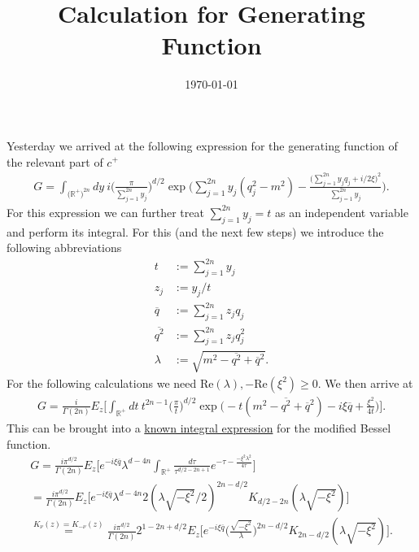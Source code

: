 \documentclass[a4paper,11pt]{article}
\begin{document}
\title{Calculation for Generating Function}
\author{ }
\date{\today}
\maketitle


Yesterday we arrived at the following expression for 
the generating function of 
the relevant part of \(c^+\)
\begin{align}
G=\int_{\big(\mathbb{R}^+\big)^{2n}}dy ~i \bigg( \frac{\pi}{\sum_{j=1}^{2n}y_j}\bigg)^{d/2}
\exp\Bigg(\sum_{j=1}^{2n}y_j(q_j^2-m^2)-\frac{\big(\sum_{j=1}^{2n}y_j q_j + i/2 \xi\big)^2}{\sum_{j=1}^{2n}y_j}\Bigg).
\end{align}
For this expression we can further treat \(\sum_{j=1}^{2n}y_j=t\) 
as an independent variable and perform its integral. For this (and the next few steps) 
we introduce the following abbreviations
\begin{align}
  t&:=\sum_{j=1}^{2n}y_j\\
  z_j&:=y_j/t\\
  \overline{q}&:=\sum_{j=1}^{2n} z_j q_j\\
  \overline{q^2}&:=\sum_{j=1}^{2n} z_j q_j^2\\
  \lambda&:=\sqrt{m^2-\overline{q^2}+\overline{q}^2}.
\end{align}
For the following calculations we need 
\(\text{Re}(\lambda),-\text{Re}(\xi^2)\ge 0\). 
We then arrive at 
\begin{align}
  G=\frac{i}{\Gamma(2n)}E_z\Bigg[\int_{\mathbb{R}^+}dt ~t^{2n-1}\bigg(\frac{\pi}{t}\bigg)^{d/2} 
  \exp\bigg(-t(m^2-\overline{q^2}+\overline{q}^2)-i\xi \overline{q}+\frac{\xi^2}{4 t}\bigg)\Bigg].
\end{align}
This can be brought into a  
\href{https://dlmf.nist.gov/10.32#E10}{known integral expression}
for the 
 modified Bessel function.
\begin{align}
  G=\frac{i \pi^{d/2}}{\Gamma(2n)}E_z\Bigg[e^{-i \xi \overline{q}}\lambda^{d-4n}\int_{\mathbb{R}^+}\frac{d\tau}{\tau^{d/2-2n +1}}e^{-\tau - \frac{-\xi^2 \lambda^2}{4 \tau}} \Bigg]\\
  =\frac{i \pi^{d/2}}{\Gamma(2n)}E_z\bigg[e^{-i\xi \overline{q}} \lambda^{d-4n}2 (\lambda \sqrt{-\xi^2}/2)^{2n-d/2}K_{d/2-2n}(\lambda \sqrt{-\xi^2}) \bigg]\\
  \overset{K_\nu(z)=K_{-\nu}(z)}{=}\frac{i \pi^{d/2}}{\Gamma(2n)}2^{1-2n+d/2}E_z\Bigg[e^{-i\xi\overline{q}}\bigg(\frac{\sqrt{-\xi^2}}{\lambda}\bigg)^{2n-d/2}K_{2n-d/2}(\lambda\sqrt{-\xi^2}) \Bigg].
\end{align}
\end{document}
